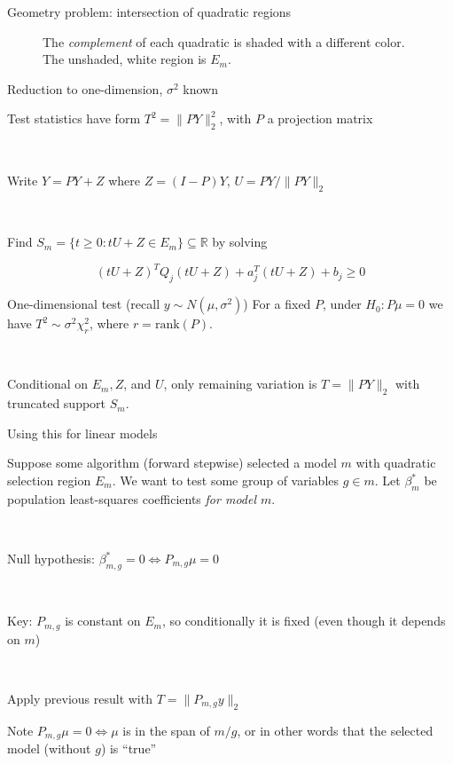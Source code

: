 \begin{frame}{Geometry problem: intersection of quadratic regions}
  
  \begin{figure}[h]
    \centering
    
    \caption{\footnotesize The \textit{complement} of each quadratic
      is shaded with a different color. The unshaded, white region is
      $E_m$.}
  \end{figure}

\end{frame}

\begin{frame}{Reduction to one-dimension, $\sigma^2$ known}
  
  Test statistics have form $T^2 = \| PY \|_2^2$, with $P$ a projection matrix

  \ 

  Write $Y = PY + Z$ where $Z = (I-P)Y$, $U = PY/\|PY\|_2$

  \ 

  Find $S_m = \{ t \geq 0 : tU+Z \in E_m \} \subseteq \mathbb R$ by
  solving

  \[
  (tU+Z)^TQ_j(tU+Z) + a^T_j(tU+Z) + b_j \geq 0
  \]
  
  \begin{block}{One-dimensional test (recall $y \sim N(\mu, \sigma^2)$)}
    For a fixed $P$, under $H_0 : P\mu = 0$ we have $T^2 \sim \sigma^2
    \chi^2_r$, where $r = \text{rank}(P)$.

    \ 

    Conditional on $E_m, Z$, and $U$, only remaining variation
    is $T = \| PY \|_2$ with truncated support $S_m$.
  \end{block}
  
\end{frame}

\begin{frame}{Using this for linear models}

  Suppose some algorithm (forward stepwise) selected a model $m$ with
  quadratic selection region $E_m$. We want to test some group of
  variables $g \in m$. Let $\beta^*_m$ be population least-squares
  coefficients \textit{for model $m$}.

  \ 

  Null hypothesis: $\beta^*_{m,g} = 0 \iff P_{m,g} \mu = 0$

  \ 

  Key: $P_{m,g}$ is constant on $E_m$, so conditionally it is fixed
  (even though it depends on $m$)

  \ 

  Apply previous result with $T = \| P_{m,g} y \|_2$

  \begin{block}{Note}
    $P_{m,g} \mu = 0 \iff \mu$ is in the span of $m \slash g$, or
    in other words that the selected model (without $g$) is ``true''
  \end{block}
\end{frame}


